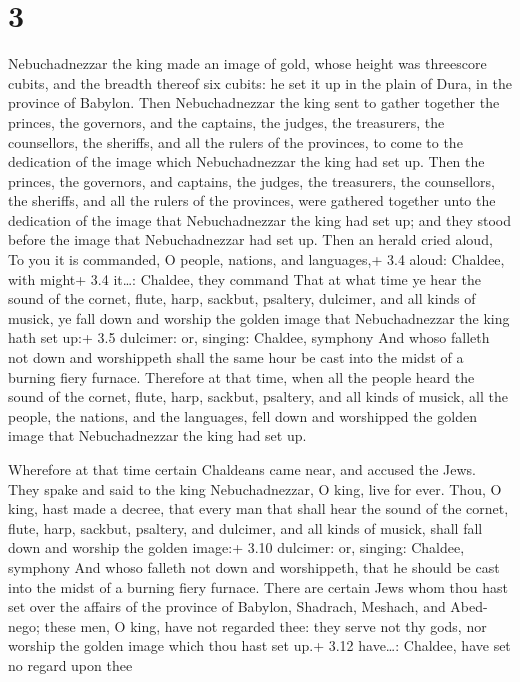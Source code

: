 \hypertarget{section-2}{%
\section{3}\label{section-2}}

 Nebuchadnezzar the king made an image of gold, whose height
was threescore cubits, and the breadth thereof six cubits: he set it up
in the plain of Dura, in the province of Babylon.  Then
Nebuchadnezzar the king sent to gather together the princes, the
governors, and the captains, the judges, the treasurers, the
counsellors, the sheriffs, and all the rulers of the provinces, to come
to the dedication of the image which Nebuchadnezzar the king had set up.
 Then the princes, the governors, and captains, the judges,
the treasurers, the counsellors, the sheriffs, and all the rulers of the
provinces, were gathered together unto the dedication of the image that
Nebuchadnezzar the king had set up; and they stood before the image that
Nebuchadnezzar had set up.  Then an herald cried aloud, To
you it is commanded, O people, nations, and languages,+ 3.4 aloud:
Chaldee, with might+ 3.4 it\ldots: Chaldee, they command 
That at what time ye hear the sound of the cornet, flute, harp, sackbut,
psaltery, dulcimer, and all kinds of musick, ye fall down and worship
the golden image that Nebuchadnezzar the king hath set up:+ 3.5
dulcimer: or, singing: Chaldee, symphony  And whoso falleth
not down and worshippeth shall the same hour be cast into the midst of a
burning fiery furnace.  Therefore at that time, when all the
people heard the sound of the cornet, flute, harp, sackbut, psaltery,
and all kinds of musick, all the people, the nations, and the languages,
fell down and worshipped the golden image that Nebuchadnezzar the king
had set up.

 Wherefore at that time certain Chaldeans came near, and
accused the Jews.  They spake and said to the king
Nebuchadnezzar, O king, live for ever.  Thou, O king, hast
made a decree, that every man that shall hear the sound of the cornet,
flute, harp, sackbut, psaltery, and dulcimer, and all kinds of musick,
shall fall down and worship the golden image:+ 3.10 dulcimer: or,
singing: Chaldee, symphony  And whoso falleth not down and
worshippeth, that he should be cast into the midst of a burning fiery
furnace.  There are certain Jews whom thou hast set over
the affairs of the province of Babylon, Shadrach, Meshach, and
Abed-nego; these men, O king, have not regarded thee: they serve not thy
gods, nor worship the golden image which thou hast set up.+ 3.12
have\ldots: Chaldee, have set no regard upon thee

